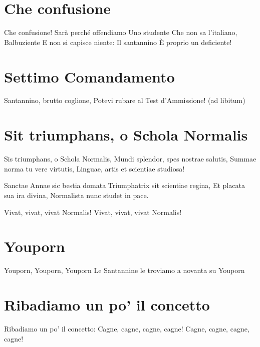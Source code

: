 \section{Che confusione}
\begin{canzone}
Che confusione!
Sarà perché offendiamo
Uno studente
Che non sa l’italiano,
Balbuziente
E non si capisce niente:
Il santannino
È proprio un deficiente!
\end{canzone}

\section{Settimo Comandamento}
\begin{canzone}
Santannino, brutto coglione,
Potevi rubare al Test d'Ammissione!
(ad libitum)
\end{canzone}

\section{Sit triumphans, o Schola Normalis}
\subtitle{Sulla melodia di “Salve invicta Juditha formosa” di A. Vivaldi}

\subtitle{Ogni verso si canta due volte}
\begin{canzone}
Sis triumphans, o Schola Normalis,
Mundi splendor, spes nostrae salutis,
Summae norma tu vere virtutis,
Linguae, artis et scientiae studiosa!

Sanctae Annae sic bestia domata
Triumphatrix sit scientiae regina,
Et placata sua ira divina,
Normalista nunc studet in pace.

Vivat, vivat, vivat Normalis!
Vivat, vivat, vivat Normalis!
\end{canzone}

\section{Youporn}
\subtitle{Sul ritornello di “Carneval de Paris” di Wender e Paolo Noise}
\begin{canzone}
Youporn, Youporn, Youporn
Le Santannine le troviamo
a novanta su Youporn
\end{canzone}

\section{Ribadiamo un po' il concetto}
\subtitle{Usualmente cantato dopo “Youporn”}
\begin{canzone}
  Ribadiamo un po' il concetto:
  Cagne, cagne, cagne, cagne!
  Cagne, cagne, cagne, cagne!
\end{canzone}

